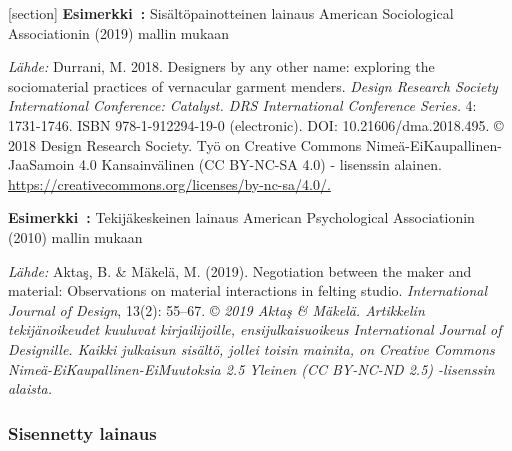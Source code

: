 \documentclass[finnish, 12pt, a4paper, elec, utf8, a-2b, online]{aaltothesis}
\begin{document}
[section]
\textsf{\textbf{Esimerkki~\theexample:}} Sisältöpainotteinen lainaus American Sociological Associationin (2019) mallin mukaan

\vspace{1ex}
\noindent
{}

\vspace{1ex}
\noindent
\textit{Lähde:} Durrani, M. 2018. Designers by any other name: exploring the 
sociomaterial practices of vernacular garment menders. \textit{Design Research 
	Society International Conference: Catalyst. DRS International Conference 
	Series.} 4: 1731-1746. ISBN 978-1-912294-19-0 (electronic). 
DOI: 10.21606/dma.2018.495. \copyright{} 2018 Design Research Society. Työ on  
Creative Commons Nimeä-EiKaupallinen-JaaSamoin 4.0 Kansainvälinen (CC BY-NC-SA 
4.0) - lisenssin alainen. 
\url{https://creativecommons.org/licenses/by-nc-sa/4.0/.}

\vspace{1em}
\noindent
{}
\textsf{\textbf{Esimerkki~\theexample:}} Tekijäkeskeinen lainaus American Psychological Associationin (2010) mallin mukaan

\vspace{1ex}
\noindent
{}

\vspace{1ex}
\noindent
\textit{Lähde:} Aktaş, B. \& Mäkelä, M. (2019). Negotiation between the maker 
and material: Observations on material interactions in felting studio. 
\textit{International Journal of Design}, 13(2): 55--67. \copyright{} 
\textit{2019 Aktaş \& Mäkelä. Artikkelin tekijänoikeudet kuuluvat 
	kirjailijoille, ensijulkaisuoikeus International Journal of Designille. 
	Kaikki julkaisun sisältö, jollei toisin mainita, on Creative Commons 
	Nimeä-EiKaupallinen-EiMuutoksia 2.5 Yleinen (CC BY-NC-ND 2.5) -lisenssin 
	alaista.}


\subsubsection*{Sisennetty lainaus}
\end{document}
